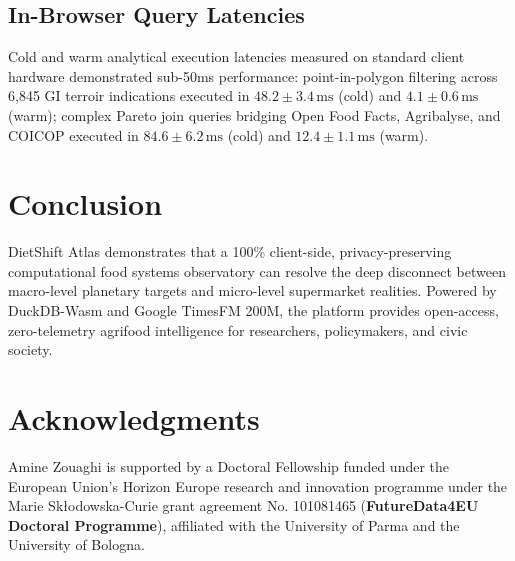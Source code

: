 \documentclass[journal,10pt,twocolumn]{article}
\begin{document}
\subsection{In-Browser Query Latencies}
Cold and warm analytical execution latencies measured on standard client hardware demonstrated sub-50ms performance: point-in-polygon filtering across 6,845 GI terroir indications executed in $48.2 \pm 3.4\,\text{ms}$ (cold) and $4.1 \pm 0.6\,\text{ms}$ (warm); complex Pareto join queries bridging Open Food Facts, Agribalyse, and COICOP executed in $84.6 \pm 6.2\,\text{ms}$ (cold) and $12.4 \pm 1.1\,\text{ms}$ (warm).

\section{Conclusion}
DietShift Atlas demonstrates that a 100\% client-side, privacy-preserving computational food systems observatory can resolve the deep disconnect between macro-level planetary targets and micro-level supermarket realities. Powered by DuckDB-Wasm and Google TimesFM 200M, the platform provides open-access, zero-telemetry agrifood intelligence for researchers, policymakers, and civic society.

\section*{Acknowledgments}
Amine Zouaghi is supported by a Doctoral Fellowship funded under the European Union's Horizon Europe research and innovation programme under the Marie Sk{\l}odowska-Curie grant agreement No. 101081465 (\textbf{FutureData4EU Doctoral Programme}), affiliated with the University of Parma and the University of Bologna.



\end{document}
